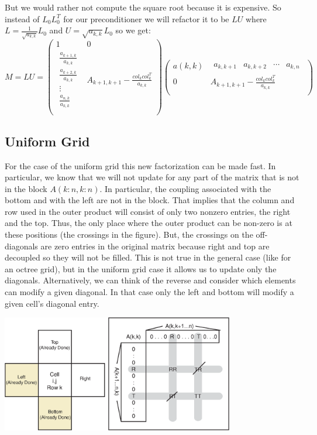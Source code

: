 \documentclass{article}
\begin{document}
But we would rather not compute the square root because it is expensive.  So instead of $L_0L_0^T$ for our preconditioner we will refactor it to be
$LU$ where $L=\frac{1}{\sqrt{a_{k,k}}}L_0$ and $U=\sqrt{a_{k,k}}L_0$ so we get:
$$M=LU=\left(\begin{array}{c|c}
1 & 0 \\
\hline \begin{array}{c} \frac{a_{k+1,k}}{{a_{k,k}}} \\ \frac{a_{k+2,k}}{{a_{k,k}}} \\
\vdots
\\ \frac{a_{n,k}}{{a_{k,k}}}
\end{array} & A_{k+1,k+1}-\frac{col_k col_k^T}{a_{k,k}}
 \\
\end{array}\right)
\left(\begin{array}{c|c}
{a(k,k)} & \begin{array}{cccc} a_{k,k+1} &a_{k,k+2} & \cdots &  a_{k,n}\end{array} \\
\hline 0 & A_{k+1,k+1}-\frac{col_k col_k^T}{a_{k,k}}
 \\
\end{array}\right)$$
\subsection{Uniform Grid}

For the case of the uniform grid this new factorization can be made fast. In particular, we know that we will not update for any part of the matrix
that is not in the block $A(k:n,k:n)$. In particular, the coupling associated with the bottom and with the left are not in the block. That implies
that the column and row used in the outer product will consist of only two nonzero entries, the right and the top. Thus, the only place where the
outer product can be non-zero is at these positions (the crossings in the figure). But, the crossings on the off-diagonals are zero entries in the
original matrix because right and top are decoupled so they will not be filled.  This is not true in the general case (like for an octree grid), but
in the uniform grid case it allows us to update only the diagonals. Alternatively, we can think of the reverse and consider which elements can modify
a given diagonal.  In that case only the left and bottom will modify a given cell's diagonal entry.

\includegraphics[width=4in]{uniform}
\end{document}
